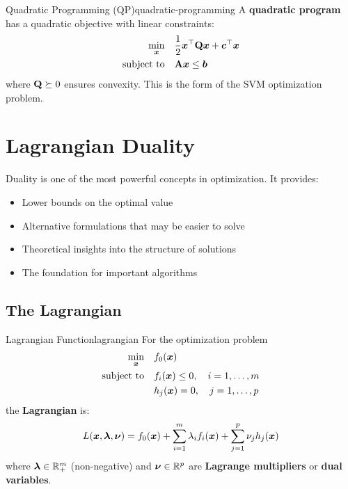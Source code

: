 \documentclass[../../main.tex]{subfiles}
\begin{document}
\begin{definition}{Quadratic Programming (QP)}{quadratic-programming}
A \textbf{quadratic program} has a quadratic objective with linear constraints:
\begin{align*}
    \min_{\boldsymbol{x}} \quad & \frac{1}{2}\boldsymbol{x}^\top \mathbf{Q} \boldsymbol{x} + \boldsymbol{c}^\top \boldsymbol{x} \\
    \text{subject to} \quad & \mathbf{A}\boldsymbol{x} \leq \boldsymbol{b}
\end{align*}
where $\mathbf{Q} \succeq 0$ ensures convexity. This is the form of the SVM optimization problem.
\end{definition}

\section{Lagrangian Duality}
\label{sec:lagrangian-duality}

Duality is one of the most powerful concepts in optimization. It provides:
\begin{itemize}
    \item Lower bounds on the optimal value
    \item Alternative formulations that may be easier to solve
    \item Theoretical insights into the structure of solutions
    \item The foundation for important algorithms
\end{itemize}

\subsection{The Lagrangian}

\begin{definition}{Lagrangian Function}{lagrangian}
For the optimization problem
\begin{align*}
    \min_{\boldsymbol{x}} \quad & f_0(\boldsymbol{x}) \\
    \text{subject to} \quad & f_i(\boldsymbol{x}) \leq 0, \quad i = 1, \ldots, m \\
    & h_j(\boldsymbol{x}) = 0, \quad j = 1, \ldots, p
\end{align*}
the \textbf{Lagrangian} is:
\[
    L(\boldsymbol{x}, \boldsymbol{\lambda}, \boldsymbol{\nu}) = f_0(\boldsymbol{x}) + \sum_{i=1}^m \lambda_i f_i(\boldsymbol{x}) + \sum_{j=1}^p \nu_j h_j(\boldsymbol{x})
\]
where $\boldsymbol{\lambda} \in \mathbb{R}^m_+$ (non-negative) and $\boldsymbol{\nu} \in \mathbb{R}^p$ are \textbf{Lagrange multipliers} or \textbf{dual variables}.
\end{definition}
\end{document}
